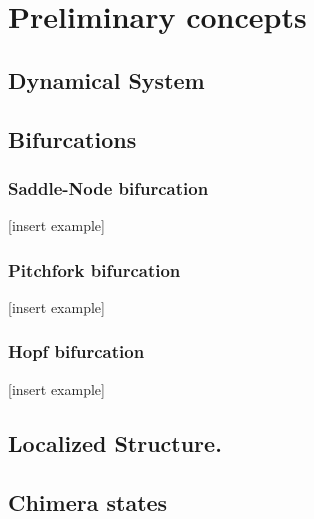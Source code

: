 \chapter{Preliminary concepts}

\section{Dynamical System}

\section{Bifurcations}

\subsection{Saddle-Node bifurcation}

[insert example]

\subsection{Pitchfork bifurcation}

[insert example]

\subsection{Hopf bifurcation}

[insert example]

\section{Localized Structure.}
\label{sec:fra_LS}

\section{Chimera states}